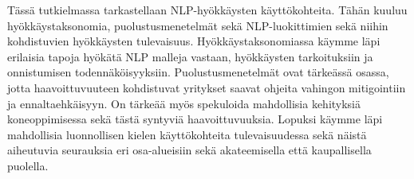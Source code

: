 Tässä tutkielmassa tarkastellaan NLP-hyökkäysten käyttökohteita. Tähän kuuluu hyökkäystaksonomia, puolustusmenetelmät sekä NLP-luokittimien sekä niihin kohdistuvien hyökkäysten tulevaisuus. Hyökkäystaksonomiassa käymme läpi erilaisia tapoja hyökätä NLP\- malleja vastaan, hyökkäysten tarkoituksiin ja onnistumisen todennäköisyyksiin. Puolustusmenetelmät ovat tärkeässä osassa, jotta haavoittuvuuteen kohdistuvat yritykset saavat ohjeita vahingon mitigointiin ja ennaltaehkäisyyn. On tärkeää myös spekuloida mahdollisia kehityksiä koneoppimisessa sekä tästä syntyviä haavoittuvuuksia. Lopuksi käymme läpi mahdollisia luonnollisen kielen käyttökohteita tulevaisuudessa sekä näistä aiheutuvia seurauksia eri osa-alueisiin sekä akateemisella että kaupallisella puolella.